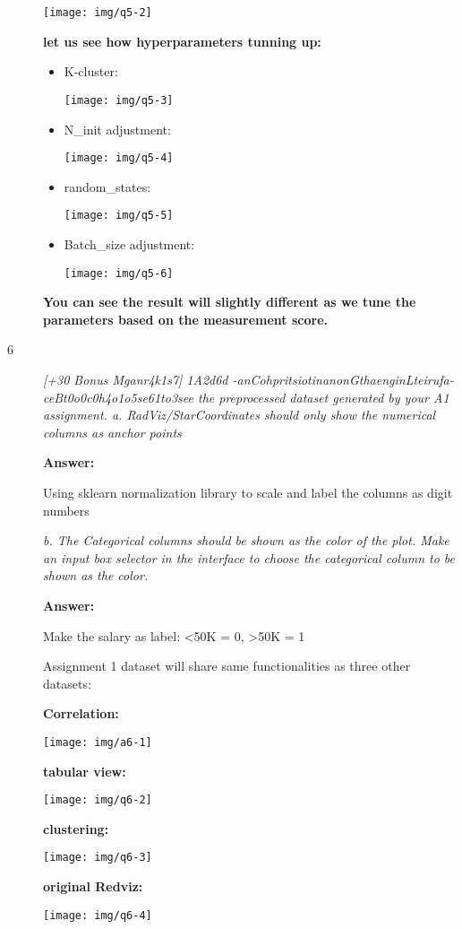 \documentclass[]{report}
\begin{document}
\begin{description}
\texttt{[image: img/q5-2]}
\bigbreak

\textbf{let us see how hyperparameters tunning up:}

\begin{itemize}
\item K-cluster:

\texttt{[image: img/q5-3]}
\bigbreak

\item N\_init adjustment:

\texttt{[image: img/q5-4]}
\bigbreak

\item random\_states:

\texttt{[image: img/q5-5]}
\bigbreak

\item Batch\_size adjustment:

\texttt{[image: img/q5-6]}
\bigbreak

\end{itemize}

\textbf{You can see the result will slightly different as we tune the parameters based on the measurement score.}


\item[6]
{\em [+30 Bonus Mganr4k1s7] 1A2d6d -anCohpritsiotinanonGthaenginLteirufa-ceBt0o0c0h4o1o5se61to3see the preprocessed dataset generated by your A1 assignment.
	a.	RadViz/StarCoordinates should only show the numerical columns as anchor points 
}


\textbf{Answer:}

Using sklearn normalization library to scale and label the columns as digit numbers

{\em b.	The Categorical columns should be shown as the color of the plot. Make an input box selector in the interface to choose the categorical column to be shown as the color.}

\textbf{Answer:}

Make the salary as label: <50K = 0, >50K = 1

Assignment 1 dataset will share same functionalities as three other datasets:

\textbf{Correlation:}

\texttt{[image: img/a6-1]}
\bigbreak

\textbf{tabular view:}

\texttt{[image: img/q6-2]}
\bigbreak

\textbf{clustering:}

\texttt{[image: img/q6-3]}
\bigbreak

\textbf{original Redviz:}

\texttt{[image: img/q6-4]}
\bigbreak



\end{description}
\end{document}
